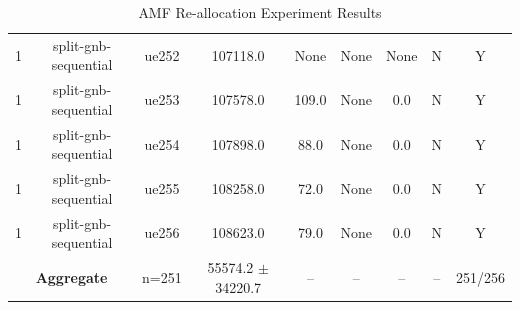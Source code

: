 \begin{table}[ht]
\begin{tabular}{|c|c|c|c|c|c|c|c|c|}
1 & split-gnb-sequential & ue252 & 107118.0 & None & None & None & N & Y \\
1 & split-gnb-sequential & ue253 & 107578.0 & 109.0 & None & 0.0 & N & Y \\
1 & split-gnb-sequential & ue254 & 107898.0 & 88.0 & None & 0.0 & N & Y \\
1 & split-gnb-sequential & ue255 & 108258.0 & 72.0 & None & 0.0 & N & Y \\
1 & split-gnb-sequential & ue256 & 108623.0 & 79.0 & None & 0.0 & N & Y \\
\multicolumn{2}{|c|}{\textbf{Aggregate}} & n=251 & 55574.2 $\pm$ 34220.7 & -- & -- & -- & -- & 251/256 \\
\hline
\end{tabular}
\caption{AMF Re-allocation Experiment Results}
\label{tab:amf_realloc}
\end{table}
